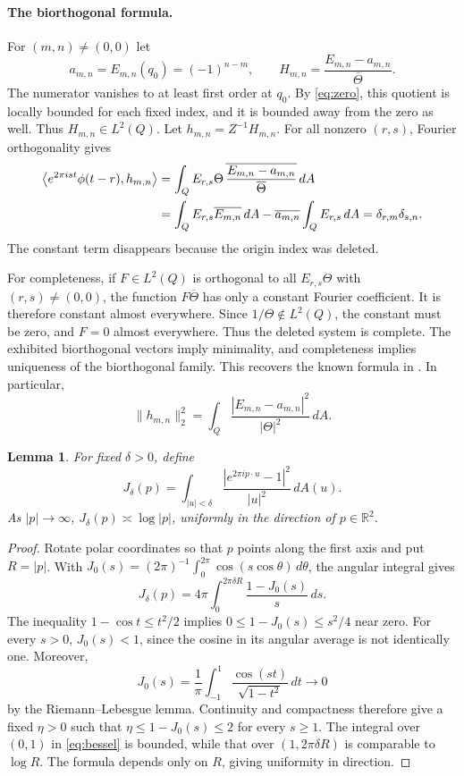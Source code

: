 \documentclass[11pt]{article}
\newtheorem{lemma}{Lemma}
\begin{document}
\paragraph{The biorthogonal formula.}
For $(m,n)\ne(0,0)$ let
\[
 a_{m,n}=E_{m,n}(q_0)=(-1)^{n-m},\qquad
 H_{m,n}=\frac{E_{m,n}-a_{m,n}}{\overline\Theta}.
\]
The numerator vanishes to at least first order at $q_0$. By
\eqref{eq:zero}, this quotient is locally bounded for each fixed index,
and it is bounded away from the zero as well. Thus $H_{m,n}\in L^2(Q)$.
Let $h_{m,n}=Z^{-1}H_{m,n}$. For all nonzero $(r,s)$, Fourier
orthogonality gives
\begin{align}
 \left\langle e^{2\pi ist}\phi(t-r),h_{m,n}\right\rangle
 &=\int_Q E_{r,s}\Theta\,
       \overline{\frac{E_{m,n}-a_{m,n}}{\overline\Theta}}\,dA\notag\\
 &=\int_Q E_{r,s}\overline{E_{m,n}}\,dA
   -\overline{a_{m,n}}\int_Q E_{r,s}\,dA
 =\delta_{r,m}\delta_{s,n}.                    \label{eq:biorth}
\end{align}
The constant term disappears because the origin index was deleted.

For completeness, if $F\in L^2(Q)$ is orthogonal to all
$E_{r,s}\Theta$ with $(r,s)\ne(0,0)$, the function $F\overline\Theta$
has only a constant Fourier coefficient. It is therefore constant
almost everywhere. Since $1/\Theta\notin L^2(Q)$, the constant must be
zero, and $F=0$ almost everywhere. Thus the deleted system is complete.
The exhibited biorthogonal vectors imply minimality, and completeness
implies uniqueness of the biorthogonal family.
This recovers the known formula in \cite[Theorem 4.2]{HHKN}. In particular,
\begin{equation}\label{eq:norm}
 \|h_{m,n}\|_2^2
 =\int_Q\frac{|E_{m,n}-a_{m,n}|^2}{|\Theta|^2}\,dA.
\end{equation}

\begin{lemma}\label{lem:integral}
For fixed $\delta>0$, define
\[
 J_\delta(p)=\int_{|u|<\delta}
       \frac{|e^{2\pi ip\cdot u}-1|^2}{|u|^2}\,dA(u).
\]
As $|p|\to\infty$, $J_\delta(p)\asymp\log|p|$, uniformly in the
direction of $p\in\mathbb R^2$.
\end{lemma}
\begin{proof}
Rotate polar coordinates so that $p$ points along the first axis and
put $R=|p|$. With
$J_0(s)=(2\pi)^{-1}\int_0^{2\pi}\cos(s\cos\theta)\,d\theta$,
the angular integral gives
\begin{equation}\label{eq:bessel}
 J_\delta(p)=4\pi\int_0^{2\pi\delta R}\frac{1-J_0(s)}s\,ds.
\end{equation}
The inequality $1-\cos t\leq t^2/2$ implies
$0\leq1-J_0(s)\leq s^2/4$ near zero.
For every $s>0$, $J_0(s)<1$, since the cosine in its angular average
is not identically one. Moreover,
\[
 J_0(s)=\frac1\pi\int_{-1}^{1}\frac{\cos(st)}{\sqrt{1-t^2}}\,dt
 \longrightarrow0
\]
by the Riemann--Lebesgue lemma. Continuity and compactness therefore
give a fixed $\eta>0$ such that
$\eta\leq1-J_0(s)\leq2$ for every $s\geq1$.
The integral over $(0,1)$ in \eqref{eq:bessel} is bounded, while that
over $(1,2\pi\delta R)$ is comparable to $\log R$.
The formula depends only on $R$, giving uniformity in direction.
\end{proof}
\end{document}
